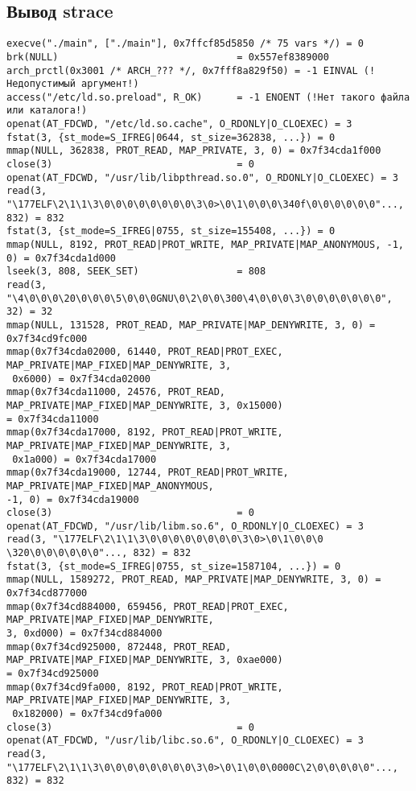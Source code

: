 \documentclass[12pt]{article}
\begin{document}
\subsection*{Вывод  strace}
{\scriptsize 
\begin{lstlisting}[escapechar=!]
execve("./main", ["./main"], 0x7ffcf85d5850 /* 75 vars */) = 0
brk(NULL)                               = 0x557ef8389000
arch_prctl(0x3001 /* ARCH_??? */, 0x7fff8a829f50) = -1 EINVAL (!Недопустимый аргумент!)
access("/etc/ld.so.preload", R_OK)      = -1 ENOENT (!Нет такого файла или каталога!)
openat(AT_FDCWD, "/etc/ld.so.cache", O_RDONLY|O_CLOEXEC) = 3
fstat(3, {st_mode=S_IFREG|0644, st_size=362838, ...}) = 0
mmap(NULL, 362838, PROT_READ, MAP_PRIVATE, 3, 0) = 0x7f34cda1f000
close(3)                                = 0
openat(AT_FDCWD, "/usr/lib/libpthread.so.0", O_RDONLY|O_CLOEXEC) = 3
read(3, "\177ELF\2\1\1\3\0\0\0\0\0\0\0\0\3\0>\0\1\0\0\0\340f\0\0\0\0\0\0"..., 832) = 832
fstat(3, {st_mode=S_IFREG|0755, st_size=155408, ...}) = 0
mmap(NULL, 8192, PROT_READ|PROT_WRITE, MAP_PRIVATE|MAP_ANONYMOUS, -1, 0) = 0x7f34cda1d000
lseek(3, 808, SEEK_SET)                 = 808
read(3, "\4\0\0\0\20\0\0\0\5\0\0\0GNU\0\2\0\0\300\4\0\0\0\3\0\0\0\0\0\0\0", 32) = 32
mmap(NULL, 131528, PROT_READ, MAP_PRIVATE|MAP_DENYWRITE, 3, 0) = 0x7f34cd9fc000
mmap(0x7f34cda02000, 61440, PROT_READ|PROT_EXEC, MAP_PRIVATE|MAP_FIXED|MAP_DENYWRITE, 3,
 0x6000) = 0x7f34cda02000
mmap(0x7f34cda11000, 24576, PROT_READ, MAP_PRIVATE|MAP_FIXED|MAP_DENYWRITE, 3, 0x15000) 
= 0x7f34cda11000
mmap(0x7f34cda17000, 8192, PROT_READ|PROT_WRITE, MAP_PRIVATE|MAP_FIXED|MAP_DENYWRITE, 3,
 0x1a000) = 0x7f34cda17000
mmap(0x7f34cda19000, 12744, PROT_READ|PROT_WRITE, MAP_PRIVATE|MAP_FIXED|MAP_ANONYMOUS, 
-1, 0) = 0x7f34cda19000
close(3)                                = 0
openat(AT_FDCWD, "/usr/lib/libm.so.6", O_RDONLY|O_CLOEXEC) = 3
read(3, "\177ELF\2\1\1\3\0\0\0\0\0\0\0\0\3\0>\0\1\0\0\0 \320\0\0\0\0\0\0"..., 832) = 832
fstat(3, {st_mode=S_IFREG|0755, st_size=1587104, ...}) = 0
mmap(NULL, 1589272, PROT_READ, MAP_PRIVATE|MAP_DENYWRITE, 3, 0) = 0x7f34cd877000
mmap(0x7f34cd884000, 659456, PROT_READ|PROT_EXEC, MAP_PRIVATE|MAP_FIXED|MAP_DENYWRITE, 
3, 0xd000) = 0x7f34cd884000
mmap(0x7f34cd925000, 872448, PROT_READ, MAP_PRIVATE|MAP_FIXED|MAP_DENYWRITE, 3, 0xae000) 
= 0x7f34cd925000
mmap(0x7f34cd9fa000, 8192, PROT_READ|PROT_WRITE, MAP_PRIVATE|MAP_FIXED|MAP_DENYWRITE, 3,
 0x182000) = 0x7f34cd9fa000
close(3)                                = 0
openat(AT_FDCWD, "/usr/lib/libc.so.6", O_RDONLY|O_CLOEXEC) = 3
read(3, "\177ELF\2\1\1\3\0\0\0\0\0\0\0\0\3\0>\0\1\0\0\0000C\2\0\0\0\0\0"..., 832) = 832

\end{lstlisting}}
\end{document}
